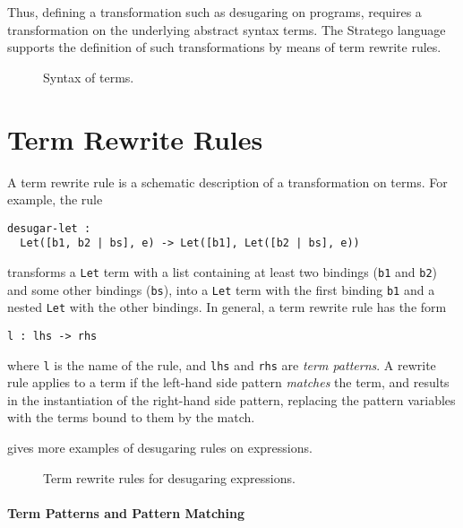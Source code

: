 Thus, defining a transformation such as desugaring on programs, requires a
transformation on the underlying abstract syntax terms. 
The Stratego language supports the definition of such transformations by means
of term rewrite rules.

\begin{figure}

\caption{Syntax of terms.}
\end{figure}


\section{Term Rewrite Rules}

A term rewrite rule is a schematic description of a transformation on terms.
For example, the rule

\begin{lstlisting}[language=Stratego]
desugar-let :
  Let([b1, b2 | bs], e) -> Let([b1], Let([b2 | bs], e))
\end{lstlisting}

transforms a \texttt{Let} term with a list containing at least two bindings
(\texttt{b1} and \texttt{b2}) and some other bindings (\texttt{bs}), into a
\texttt{Let} term with the first binding \texttt{b1} and a nested \texttt{Let}
with the other bindings.
In general, a term rewrite rule has the form

\begin{lstlisting}[language=Stratego]
l : lhs -> rhs
\end{lstlisting}

where \texttt{l} is the name of the rule, and \texttt{lhs} and \texttt{rhs} are
\emph{term patterns}.
A rewrite rule applies to a term if the left-hand side pattern \emph{matches}
the term, and results in the instantiation of the right-hand side pattern,
replacing the pattern variables with the terms bound to them by the match.

 gives more examples of desugaring rules on
expressions.


\begin{figure}[t]

\caption{Term rewrite rules for desugaring expressions.}
\end{figure}


\paragraph{Term Patterns and Pattern Matching}

